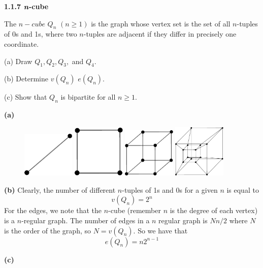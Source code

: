 \documentclass{article}
\begin{document}
\bigskip\par\textbf{1.1.7 $\textit{\textbf{n}}$-cube}
\par\smallskip
The $n-cube$ $Q_n$ $(n \geq 1)$ is the graph whose vertex set is the set of all $n$-tuples of 0s and 1s, where two $n$-tuples are adjacent if they differ in precisely one coordinate. 
\par\smallskip
(a) Draw $Q_1, Q_2, Q_3,$ and $Q_4$.
\par
(b) Determine $v(Q_n)$ $e(Q_n)$.
\par
(c) Show that $Q_n$ is bipartite for all $n \geq 1$.
\par\smallskip\textbf{(a)}
\begin{figure}[ht]
\centering
\includegraphics[width = 25mm]{1.1.7ai.pdf}
\includegraphics[width = 25mm]{1.1.7aii.pdf}
\includegraphics[width = 25mm]{1.1.7aiii.pdf}
\includegraphics[width = 25mm]{1.1.7aiv.pdf}
\end{figure}
\par\smallskip\textbf{(b)} Clearly, the number of different $n$-tuples of 1s and 0s for a given $n$ is equal to $$v(Q_n)=2^n$$ For the edges, we note that the $n$-cube (remember $n$ is the degree of each vertex) is a $n$-regular graph. The number of edges in a $n$ regular graph is $Nn/2$ where $N$ is the order of the graph, so $N=v(Q_n)$. So we have that $$e(Q_n)=n2^{n-1}$$
\par\smallskip\textbf{(c)} 
\end{document}

